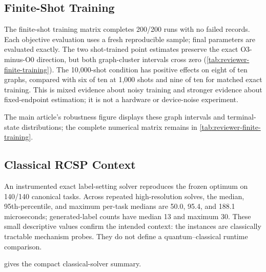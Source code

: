 \FloatBarrier
\subsection{Finite-Shot Training}
\label{app:reviewer-finite-shot}

The finite-shot training matrix completes 200/200 runs with no failed records.
Each objective evaluation uses a fresh reproducible sample; final parameters
are evaluated exactly. The two shot-trained point estimates preserve the
exact O3-minus-O0 direction, but both graph-cluster intervals cross zero
(\cref{tab:reviewer-finite-training}). The 10,000-shot condition has positive
effects on eight of ten graphs, compared with six of ten at 1,000 shots and
nine of ten for matched exact training. This is mixed evidence about noisy
training and stronger evidence about fixed-endpoint estimation; it is not a
hardware or device-noise experiment.



The main article's robustness figure displays these graph intervals and
terminal-state distributions; the complete numerical matrix remains in
\cref{tab:reviewer-finite-training}.

\FloatBarrier
\subsection{Classical RCSP Context}

An instrumented exact label-setting solver reproduces the frozen optimum on
140/140 canonical tasks. Across repeated high-resolution solves, the median,
95th-percentile, and maximum per-task medians are 50.0, 95.4, and
188.1 microseconds; generated-label counts have median 13 and maximum 30.
These small descriptive values confirm the intended context: the instances
are classically tractable mechanism probes. They do not define a
quantum--classical runtime comparison.

 gives the compact classical-solver summary.


\FloatBarrier
